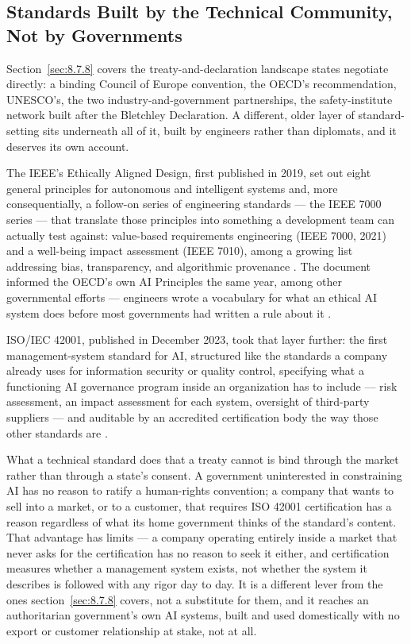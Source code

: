 \subsection{Standards Built by the Technical Community, Not by Governments}
\label{sec:8.7.2}
Section~\ref{sec:8.7.8} covers the treaty-and-declaration landscape states negotiate directly: a binding Council of Europe convention, the OECD's recommendation, UNESCO's, the two industry-and-government partnerships, the safety-institute network built after the Bletchley Declaration. A different, older layer of standard-setting sits underneath all of it, built by engineers rather than diplomats, and it deserves its own account.

The IEEE's Ethically Aligned Design, first published in 2019, set out eight general principles for autonomous and intelligent systems and, more consequentially, a follow-on series of engineering standards — the IEEE 7000 series — that translate those principles into something a development team can actually test against: value-based requirements engineering (IEEE 7000, 2021) and a well-being impact assessment (IEEE 7010), among a growing list addressing bias, transparency, and algorithmic provenance \autocite{ieee2019eadand7000series}. The document informed the OECD's own AI Principles the same year, among other governmental efforts — engineers wrote a vocabulary for what an ethical AI system does before most governments had written a rule about it \autocite{oecd2019aiprinciples}.

ISO/IEC 42001, published in December 2023, took that layer further: the first management-system standard for AI, structured like the standards a company already uses for information security or quality control, specifying what a functioning AI governance program inside an organization has to include — risk assessment, an impact assessment for each system, oversight of third-party suppliers — and auditable by an accredited certification body the way those other standards are \autocite{iso2023iec42001}.

What a technical standard does that a treaty cannot is bind through the market rather than through a state's consent. A government uninterested in constraining AI has no reason to ratify a human-rights convention; a company that wants to sell into a market, or to a customer, that requires ISO 42001 certification has a reason regardless of what its home government thinks of the standard's content. That advantage has limits — a company operating entirely inside a market that never asks for the certification has no reason to seek it either, and certification measures whether a management system exists, not whether the system it describes is followed with any rigor day to day. It is a different lever from the ones section~\ref{sec:8.7.8} covers, not a substitute for them, and it reaches an authoritarian government's own AI systems, built and used domestically with no export or customer relationship at stake, not at all.
